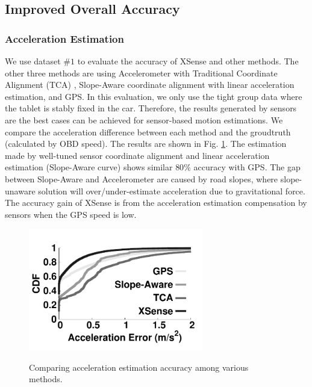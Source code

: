 \subsection{Improved Overall Accuracy}

\subsubsection{Acceleration Estimation}


We use dataset $\#1$ to evaluate the accuracy of XSense and
other methods. 
The other three methods are using Accelerometer with Traditional Coordinate
Alignment (TCA)  \cite{hansenspeed, wang2013sensing, chen2015invisible}, 
Slope-Aware coordinate alignment with linear 
acceleration estimation, 
and GPS.
In this evaluation, we only use the tight group data where the 
tablet is stably fixed in the car.  
Therefore, the results generated by sensors are 
the best cases can be achieved for sensor-based motion estimations. 
We compare the acceleration difference between
each method and the groudtruth (calculated by OBD speed). 
The results are shown in Fig. \ref{xsense_accuracy}. 
The estimation made by well-tuned sensor coordinate alignment and 
linear acceleration estimation (Slope-Aware curve)
shows similar $80\%$ accuracy with GPS. 
The gap between Slope-Aware and Accelerometer are caused
by road slopes, 
where slope-unaware solution will over/under-estimate 
acceleration due to gravitational force. 
The accuracy gain of XSense is from the 
acceleration estimation compensation by sensors
when the GPS speed is low. 

 

\begin{figure}[t]
\begin{center}
\includegraphics[width=3.0in,angle=0]{Figs/DriveSense/evaluation/xsense_accuracy.pdf}
\vspace{-0.2cm}
\caption{Comparing acceleration estimation accuracy among various methods.}
\vspace{-0.3cm}
\label{xsense_accuracy}
\end{center}
\end{figure}





